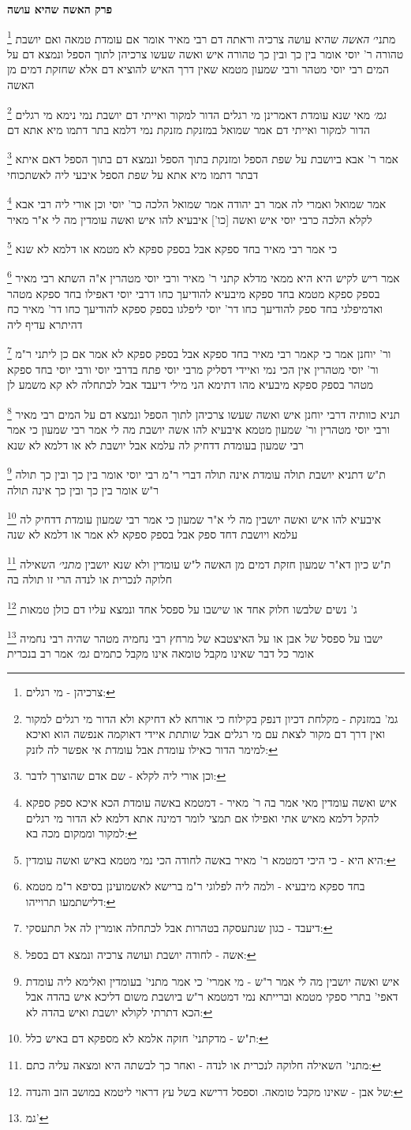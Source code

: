 \documentclass[12pt, openany]{book}
\newcommand{\sethebfont}{
\fontsize{10.5pt}{21.0pt} \selectfont
}
\newcommand{\twocol}[1]{
	{\sethebfont \begin{multicols}{2}
			#1
	\end{multicols}}	
}
\newcommand{\chapname}{}
\newcommand{\newchap}[1]{
	\addcontentsline{toc}{chapter}{#1}
	\renewcommand{\chapname}{#1}
		\begin{center}
			\textbf{%
\fontsize{16pt}{16pt}\selectfont
				#1}
		\end{center}
}
\newcommand{\footnotecomment}[1]{
	\renewcommand\thefootnote{}
	\footnote{#1}}
\newcommand{\commenta}[1]{\footnotecomment{#1}}
\begin{document}
\newchap{פרק  האשה שהיא עושה}
\twocol{
\commenta{צרכיהן - מי רגלים:}
מתני׳ {\large\emph{האשה}} שהיא עושה צרכיה וראתה דם רבי מאיר אומר אם עומדת טמאה ואם יושבת טהורה ר' יוסי אומר בין כך ובין כך טהורה 
איש ואשה שעשו צרכיהן לתוך הספל ונמצא דם על המים רבי יוסי מטהר ורבי שמעון מטמא שאין דרך האיש להוציא דם אלא שחזקת דמים מן האשה
\commenta{גמ' במזנקת - מקלחת דכיון דנפק בקילוח כי אורחא לא דחיקא ולא הדור מי רגלים למקור ואין דרך דם מקור לצאת עם מי רגלים אבל שותתת איידי דאוקמה אנפשה הוא ואיכא למימר הדור כאילו עומדת אבל עומדת אי אפשר לה לזנק:}
{\large\emph{גמ׳}} מאי שנא עומדת דאמרינן מי רגלים הדור למקור ואייתי דם יושבת נמי נימא מי רגלים הדור למקור ואייתי דם
אמר שמואל במזנקת מזנקת נמי דלמא בתר דתמו מיא אתא דם 
\commenta{וכן אורי ליה לקלא - שם אדם שהוצרך לדבר:}
אמר ר' אבא ביושבת על שפת הספל ומזנקת בתוך הספל ונמצא דם בתוך הספל דאם איתא דבתר דתמו מיא אתא על שפת הספל איבעי ליה לאשתכוחי 
\commenta{איש ואשה עומדין מאי אמר בה ר' מאיר - דמטמא באשה עומדת הכא איכא ספק ספקא להקל דלמא מאיש אתי ואפילו אם תמצי לומר דמינה אתא דלמא לא הדור מי רגלים למקור וממקום מכה בא:}
אמר שמואל ואמרי לה אמר רב יהודה אמר שמואל הלכה כר' יוסי וכן אורי ליה רבי אבא לקלא הלכה כרבי יוסי
איש ואשה [כו'] איבעיא להו איש ואשה עומדין מה לי א"ר מאיר 
\commenta{היא היא - כי היכי דמטמא ר' מאיר באשה לחודה הכי נמי מטמא באיש ואשה עומדין:}
כי אמר רבי מאיר בחד ספקא אבל בספק ספקא לא מטמא או דלמא לא שנא 
\commenta{בחד ספקא מיבעיא - ולמה ליה לפלוגי ר"מ ברישא לאשמועינן בסיפא ר"מ מטמא דלישתמעו תרוייהו:}
אמר ריש לקיש היא היא ממאי מדלא קתני ר' מאיר ורבי יוסי מטהרין 
א"ה השתא רבי מאיר בספק ספקא מטמא בחד ספקא מיבעיא להודיעך כחו דרבי יוסי דאפילו בחד ספקא מטהר 
ואדמיפלגי בחד ספק להודיעך כחו דר' יוסי ליפלגו בספק ספקא להודיעך כחו דר' מאיר כח דהיתרא עדיף ליה 
\commenta{דיעבד - כגון שנתעסקה בטהרות אבל לכתחלה אומרין לה אל תתעסקי:}
ור' יוחנן אמר כי קאמר רבי מאיר בחד ספקא אבל בספק ספקא לא אמר אם כן ליתני ר"מ ור' יוסי מטהרין אין הכי נמי ואיידי דסליק מרבי יוסי פתח בדרבי יוסי 
ורבי יוסי בחד ספקא מטהר בספק ספקא מיבעיא מהו דתימא הני מילי דיעבד אבל לכתחלה לא קא משמע לן 
\commenta{אשה - לחודה יושבת ועושה צרכיה ונמצא דם בספל:}
תניא כוותיה דרבי יוחנן איש ואשה שעשו צרכיהן לתוך הספל ונמצא דם על המים רבי מאיר ורבי יוסי מטהרין ור' שמעון מטמא 
איבעיא להו אשה יושבת מה לי אמר רבי שמעון כי אמר רבי שמעון בעומדת דדחיק לה עלמא אבל יושבת לא או דלמא לא שנא 
\commenta{איש ואשה יושבין מה לי אמר ר"ש - מי אמרי' כי אמר מתני' בעומדין ואלימא ליה עומדת דאפי' בתרי ספקי מטמא וברייתא נמי דמטמא ר"ש ביושבת משום דליכא איש בהדה אבל הכא דתרתי לקולא יושבת ואיש בהדה לא:}
ת"ש דתניא יושבת תולה עומדת אינה תולה דברי ר"מ רבי יוסי אומר בין כך ובין כך תולה ר"ש אומר בין כך ובין כך אינה תולה 
\commenta{ת"ש - מדקתני' חזקה אלמא לא מספקא דם באיש כלל:}
איבעיא להו איש ואשה יושבין מה לי א"ר שמעון כי אמר רבי שמעון עומדת דדחיק לה עלמא ויושבת דחד ספק אבל בספק ספקא לא אמר או דלמא לא שנה 
\commenta{מתני' השאילה חלוקה לנכרית או לנדה - ואחר כך לבשתה היא ומצאה עליה כתם:}
ת"ש כיון דא"ר שמעון חזקת דמים מן האשה ל"ש עומדין ולא שנא יושבין
{\large\emph{מתני׳}} השאילה חלוקה לנכרית או לנדה הרי זו תולה בה
\commenta{של אבן - שאינו מקבל טומאה. וספסל דרישא בשל עץ דראוי ליטמא במושב הזב והנדה:}
ג' נשים שלבשו חלוק אחד או שישבו על ספסל אחד ונמצא עליו דם כולן טמאות 
\commenta{גמ'}
ישבו על ספסל של אבן או על האיצטבא של מרחץ רבי נחמיה מטהר שהיה רבי נחמיה אומר כל דבר שאינו מקבל טומאה אינו מקבל כתמים
{\large\emph{גמ׳}} אמר רב בנכרית}
\end{document}
